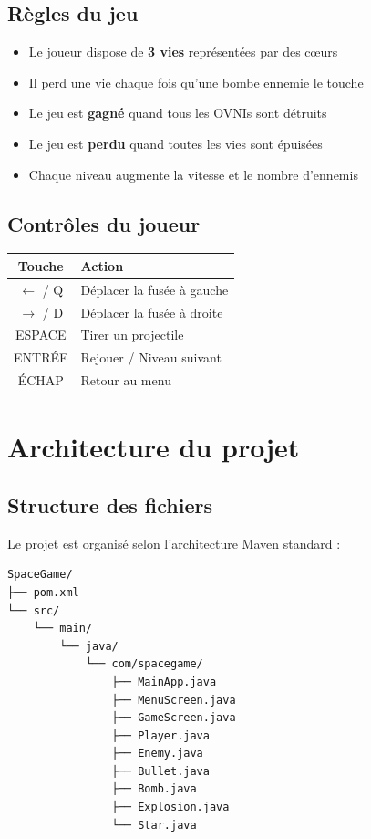 \documentclass[12pt,a4paper]{report}
\begin{document}
\subsection{Règles du jeu}
\begin{itemize}[leftmargin=1.5cm]
  \item Le joueur dispose de \textbf{3 vies} représentées par des c\oe{}urs
  \item Il perd une vie chaque fois qu'une bombe ennemie le touche
  \item Le jeu est \textbf{gagné} quand tous les OVNIs sont détruits
  \item Le jeu est \textbf{perdu} quand toutes les vies sont épuisées
  \item Chaque niveau augmente la vitesse et le nombre d'ennemis
\end{itemize}

\subsection{Contrôles du joueur}
\begin{center}
\begin{tabular}{|c|l|}
\hline
\textbf{Touche} & \textbf{Action} \\
\hline
$\leftarrow$ / Q & Déplacer la fusée à gauche \\
$\rightarrow$ / D & Déplacer la fusée à droite \\
ESPACE & Tirer un projectile \\
ENTRÉE & Rejouer / Niveau suivant \\
ÉCHAP & Retour au menu \\
\hline
\end{tabular}
\end{center}

\section{Architecture du projet}

\subsection{Structure des fichiers}
Le projet est organisé selon l'architecture Maven standard :

\begin{verbatim}
SpaceGame/
├── pom.xml
└── src/
    └── main/
        └── java/
            └── com/spacegame/
                ├── MainApp.java
                ├── MenuScreen.java
                ├── GameScreen.java
                ├── Player.java
                ├── Enemy.java
                ├── Bullet.java
                ├── Bomb.java
                ├── Explosion.java
                └── Star.java
\end{verbatim}
\end{document}
